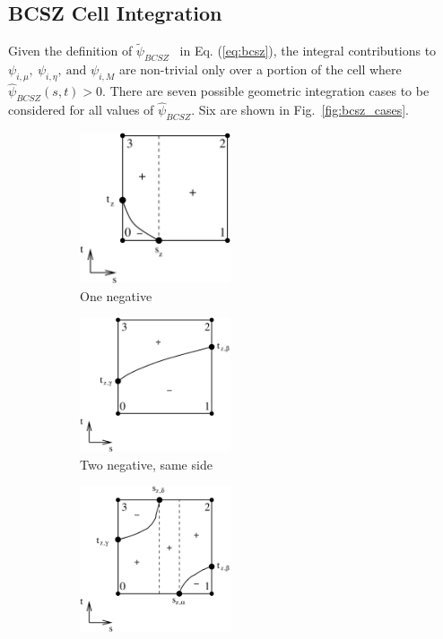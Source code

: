 \documentclass{mc2015}
\newcommand{\fig}[1]{Fig.~\ref{#1}}                      %
\newcommand{\eqt}[1]{Eq. (\ref{#1})}  %
\newcommand{\BCSZ}{\ensuremath{\widetilde{\psi}_{BCSZ}}}
\newcommand{\BCSZH}{\ensuremath{\widehat{\psi}_{BCSZ}}}
\begin{document}
\subsection{BCSZ Cell Integration}
Given the definition of \BCSZ~ in \eqt{eq:bcsz}, the integral contributions to $\psi_{i,\mu},~\psi_{i,\eta},~\text{and }\psi_{i,M}$ are non-trivial only over a portion of the cell where $\BCSZH(s,t) > 0$.
There are seven possible geometric integration cases to be considered for all values of \BCSZH.  Six are shown in \fig{fig:bcsz_cases}.
\begin{figure}[h]
\begin{center}
	\begin{subfigure}{0.32\textwidth}
		\begin{center}
		\includegraphics[width=1.75in]{one_neg_pdt_int} 		
		\caption{One negative}
		\label{fig:one_node}
		\end{center}
	\end{subfigure}
	\begin{subfigure}{0.32\textwidth}
		\begin{center}
		\includegraphics[width=1.75in]{neg_same_side_pdt_int}
		\caption{Two negative, same side}
		\label{fig:two_same_side}
		\end{center}
	\end{subfigure}
	\begin{subfigure}{0.32\textwidth}
		\begin{center}
		\includegraphics[width=1.75in]{opp_neg_more_pos_pdt_int}

\end{center}
\end{subfigure}
\end{center}
\end{figure}
\end{document}
